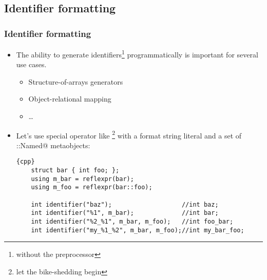\documentclass[compress,table,xcolor=table]{beamer}
\begin{document}
\subsection{Identifier formatting}
\begin{frame}[fragile]
\frametitle{Identifier formatting}
  \small
  \begin{itemize}
    \item The ability to generate identifiers\footnote{without the preprocessor}
       programmatically is important for several use cases.
    \begin{itemize}
      \footnotesize
      \item Structure-of-arrays generators
      \item Object-relational mapping
      \item \ldots
    \end{itemize}
    \item Let's use special operator like \verb@identifier@\footnote{let the
      bike-shedding begin} with a format string literal
      and a set of \verb@meta::Named@ metaobjects:
      \begin{lstlisting}{cpp}
	struct bar { int foo; };
	using m_bar = reflexpr(bar);
	using m_foo = reflexpr(bar::foo);

	int identifier("baz");                   //int baz;
	int identifier("%1", m_bar);             //int bar;
	int identifier("%2_%1", m_bar, m_foo);   //int foo_bar;
	int identifier("my_%1_%2", m_bar, m_foo);//int my_bar_foo;
      \end{lstlisting}
\end{itemize}
\end{frame}
\end{document}

